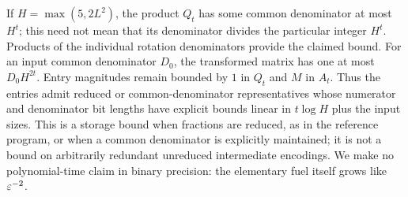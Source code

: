 If $H=\max(5,2L^2)$, the product $Q_t$ has some common denominator at most $H^t$; this need not mean that its denominator divides the particular integer $H^t$. Products of the individual rotation denominators provide the claimed bound. For an input common denominator $D_0$, the transformed matrix has one at most $D_0H^{2t}$. Entry magnitudes remain bounded by $1$ in $Q_t$ and $M$ in $A_t$. Thus the entries admit reduced or common-denominator representatives whose numerator and denominator bit lengths have explicit bounds linear in $t\log H$ plus the input sizes. This is a storage bound when fractions are reduced, as in the reference program, or when a common denominator is explicitly maintained; it is not a bound on arbitrarily redundant unreduced intermediate encodings. We make no polynomial-time claim in binary precision: the elementary fuel itself grows like $\varepsilon^{-2}$.
